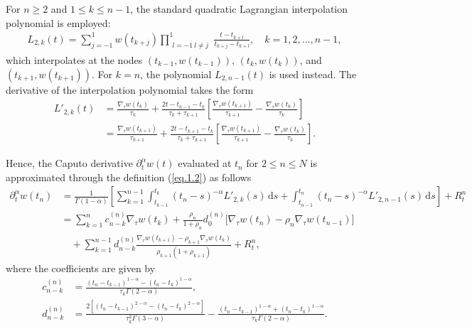 \documentclass{siamart171218}
\theoremstyle{remark}
\theoremstyle{example}
\numberwithin{equation}{section}
\begin{document}
For $n \geq 2$ and $1 \leq k \leq n-1$, the standard quadratic Lagrangian interpolation polynomial is employed:
\begin{align*}
L_{2,k}(t) = \sum_{j=-1}^{1} w(t_{k+j}) \prod_{\substack{l=-1 \ l \neq j}}^{1} \frac{t - t_{k+l}}{t_{k+j} - t_{k+l}}, \quad k = 1, 2, \ldots, n-1,
\end{align*}
which interpolates at the nodes $(t_{k-1}, w(t_{k-1}))$, $(t_k, w(t_k))$, and $(t_{k+1}, w(t_{k+1}))$. For $k = n$, the polynomial $L_{2,n-1}(t)$ is used instead. The derivative of the interpolation polynomial takes the form
\begin{align*}
    L'_{2,k}(t) &= \frac{\nabla_\tau w(t_k)}{\tau_k} + \frac{2t - t_{k-1} - t_k}{\tau_k + \tau_{k+1}} \left[\frac{\nabla_\tau w(t_{k+1})}{\tau_{k+1}} - \frac{\nabla_\tau w(t_k)}{\tau_k} \right] \\
    &= \frac{\nabla_\tau w(t_{k+1})}{\tau_{k+1}} + \frac{2t - t_{k+1} - t_k}{\tau_k + \tau_{k+1}} \left[ \frac{\nabla_\tau w(t_{k+1})}{\tau_{k+1}} - \frac{\nabla_\tau w(t_k)}{\tau_k} \right].
\end{align*}

Hence, the Caputo derivative $\partial^\alpha_t w(t)$ evaluated at $t_n$ for $2 \leq n \leq N$ is approximated through the definition (\ref{eq.1.2}) as follows
\begin{equation}\label{eq.2.1}
    \begin{aligned}
        \partial^\alpha_t w(t_n) &= \frac{1}{\Gamma(1-\alpha)} \left[ \sum_{k=1}^{n-1} \int_{t_{k-1}}^{t_k} (t_n - s)^{-\alpha} L'_{2,k}(s) \, \mathrm{d}s + \int_{t_{n-1}}^{t_n} (t_n - s)^{-\alpha} L'_{2,n-1}(s) \, \mathrm{d}s \right] + R_t^n \\
        &= \sum_{k=1}^{n} c_{n-k}^{(n)} \nabla_\tau w(t_k) + \frac{\rho_n}{1 + \rho_n} d_0^{(n)} \bigg[\nabla_\tau w(t_n) - \rho_n \nabla_\tau w(t_{n-1}) \bigg] \\
        &\quad + \sum_{k=1}^{n-1} d_{n-k}^{(n)} \frac{\nabla_\tau w(t_{k+1}) - \rho_{k+1} \nabla_\tau w(t_k)}{\rho_{k+1} (1 + \rho_{k+1}) } + R_t^n,
    \end{aligned}
\end{equation}
where the coefficients are given by
\begin{equation}\label{eq.2.2}
	\begin{aligned}
		c_{n-k}^{(n)} &= \frac{(t_n - t_{k-1})^{1-\alpha} - (t_n - t_k)^{1-\alpha}}{\tau_k \Gamma(2-\alpha)}, \\
		d_{n-k}^{(n)} &= \frac{2 \left[ (t_n - t_{k-1})^{2-\alpha} - (t_n - t_k)^{2-\alpha} \right]}{\tau_k^2 \Gamma(3-\alpha)} - \frac{(t_n - t_{k-1})^{1-\alpha} + (t_n - t_k)^{1-\alpha}}{\tau_k \Gamma(2-\alpha)}.
	\end{aligned}
\end{equation}
\end{document}
